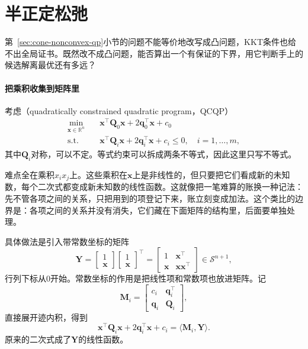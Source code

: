\section{半正定松弛}
\label{sec:cone-relax}

第~\ref{sec:cone-nonconvex-qp}小节的问题不能等价地改写成凸问题，KKT条件也给不出全局证书。既然改不成凸问题，能否算出一个有保证的下界，用它判断手上的候选解离最优还有多远？

\paragraph{把乘积收集到矩阵里}
考虑（quadratically constrained quadratic program，QCQP）
\begin{equation}
 \begin{aligned}
 \min_{\bm{x}\in\mathbb{R}^n}\quad&\bm{x}^\top\bm{Q}_0\bm{x}+2\bm{q}_0^\top\bm{x}+c_0\\
 \text{s.t.}\quad&\bm{x}^\top\bm{Q}_i\bm{x}+2\bm{q}_i^\top\bm{x}+c_i\leq0,\quad i=1,\ldots,m,
 \end{aligned}
 \label{eq:cone-qcqp}
\end{equation}
其中$\bm{Q}_i$对称，可以不定。等式约束可以拆成两条不等式，因此这里只写不等式。

难点全在乘积$x_ix_j$上。这些乘积在$\bm{x}$上是非线性的，但只要把它们看成新的未知数，每个二次式都变成新未知数的线性函数。这就像把一笔难算的账换一种记法：先不管各项之间的关系，只把用到的项登记下来，账立刻变成加法。这个类比的边界是：各项之间的关系并没有消失，它们藏在下面矩阵的结构里，后面要单独处理。

具体做法是引入带常数坐标的矩阵
\begin{equation}
 \bm{Y}=\begin{bmatrix}1\\\bm{x}\end{bmatrix}\begin{bmatrix}1\\\bm{x}\end{bmatrix}^\top=\begin{bmatrix}1&\bm{x}^\top\\\bm{x}&\bm{x}\bm{x}^\top\end{bmatrix}\in\mathcal{S}^{n+1},
 \label{eq:cone-lift-matrix}
\end{equation}
行列下标从$0$开始。常数坐标的作用是把线性项和常数项也放进矩阵。记
\[
 \bm{M}_i=\begin{bmatrix}c_i&\bm{q}_i^\top\\\bm{q}_i&\bm{Q}_i\end{bmatrix},
\]
直接展开迹内积，得到
\begin{equation}
 \bm{x}^\top\bm{Q}_i\bm{x}+2\bm{q}_i^\top\bm{x}+c_i=\langle\bm{M}_i,\bm{Y}\rangle.
 \label{eq:cone-lift-linear}
\end{equation}
原来的二次式成了$\bm{Y}$的线性函数。

